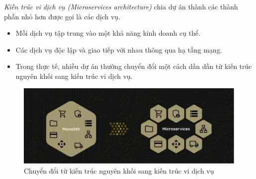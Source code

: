 \emph{Kiến trúc vi dịch vụ (Microservices architecture)} chia dự án thành các thành phần nhỏ hơn được gọi là các dịch vụ.

\begin{itemize}

    \item Mỗi dịch vụ tập trung vào một khả năng kinh doanh cụ thể.

    \item Các dịch vụ độc lập và giao tiếp với nhau thông qua hạ tầng mạng.

    \item Trong thực tế, nhiều dự án thường chuyển đổi một cách dần dần từ kiến trúc nguyên khối sang kiến trúc vi dịch vụ.

\end{itemize}

\begin{figure}[H]

    \centering

    \includegraphics[scale = 0.4]{pictures/_chuyen_doi_tu_kien_truc_nguyen_khoi_sang_kien_truc_vi_dich_vu/main.drawio.png}

    \caption{Chuyển đổi từ kiến trúc nguyên khối sang kiến trúc vi dịch vụ}

\end{figure}
